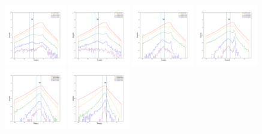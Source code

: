 \documentclass[12pt,prd]{article}
\begin{document}
\begin{figure}[h!]
\includegraphics[width=0.24\textwidth]{../figures/scanning_plotsgaiascan_l337_5_b74_4_ra201_9_dec14_0_npy_6.pdf}
\includegraphics[width=0.24\textwidth]{../figures/scanning_plotsgaiascan_l337_5_b74_4_ra201_9_dec14_0_npy_7.pdf}
\includegraphics[width=0.24\textwidth]{../figures/scanning_plotsgaiascan_l337_5_b74_4_ra201_9_dec14_0_npy_8.pdf}
\includegraphics[width=0.24\textwidth]{../figures/scanning_plotsgaiascan_l337_5_b74_4_ra201_9_dec14_0_npy_9.pdf}
\includegraphics[width=0.24\textwidth]{../figures/scanning_plotsgaiascan_l337_5_b74_4_ra201_9_dec14_0_npy_10.pdf}
\includegraphics[width=0.24\textwidth]{../figures/scanning_plotsgaiascan_l337_5_b74_4_ra201_9_dec14_0_npy_11.pdf}

\end{figure}
\end{document}
